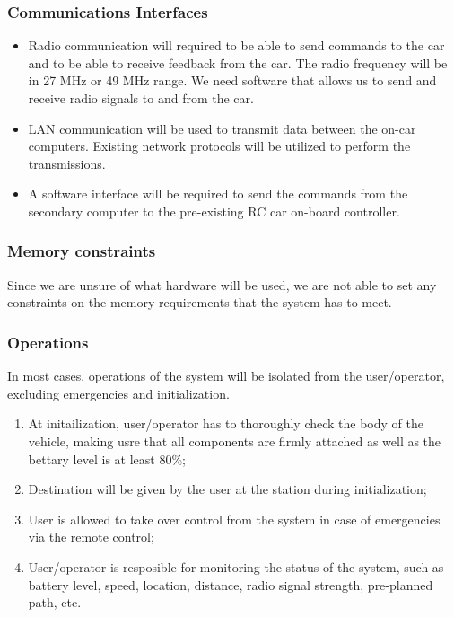 \documentclass[compsoc,draftclsnofoot,onecolumn,10pt]{IEEEtran}
\begin{document}
\subsubsection{Communications Interfaces} %
\begin{itemize}
	\item Radio communication will required to be able to send commands to the car and
	to be able to receive feedback from the car. The radio frequency will be in 27
	MHz or 49 MHz range. We need software that allows us to send and receive radio
	signals to and from the car. 
	
	\item LAN communication will be used to transmit data between the on-car computers.
	Existing network protocols will be utilized to perform the transmissions.
	
	\item A software interface will be required to send the commands from the
	secondary computer to the pre-existing RC car on-board controller.
	
\end{itemize}


\subsubsection{Memory constraints} %
Since we are unsure of what hardware will be used, we are not able to set any 
constraints on the memory requirements that the system has to meet. 

\subsubsection{Operations} %
In most cases, operations of the system will be isolated from the user/operator,
excluding emergencies and initialization.  
\begin{enumerate}
	\item At initailization, user/operator has to thoroughly check the body of the
	vehicle, making usre that all components are firmly attached as well as the 
	bettary level is at least 80\%;
	\item Destination will be given by the user at the station during initialization;
	\item User is allowed to take over control from the system in case of emergencies
	via the remote control;
	\item User/operator is resposible for monitoring the status of the system, such as 
	battery level, speed, location, distance, radio signal strength, pre-planned path, 
	etc.
\end{enumerate}
\end{document}
